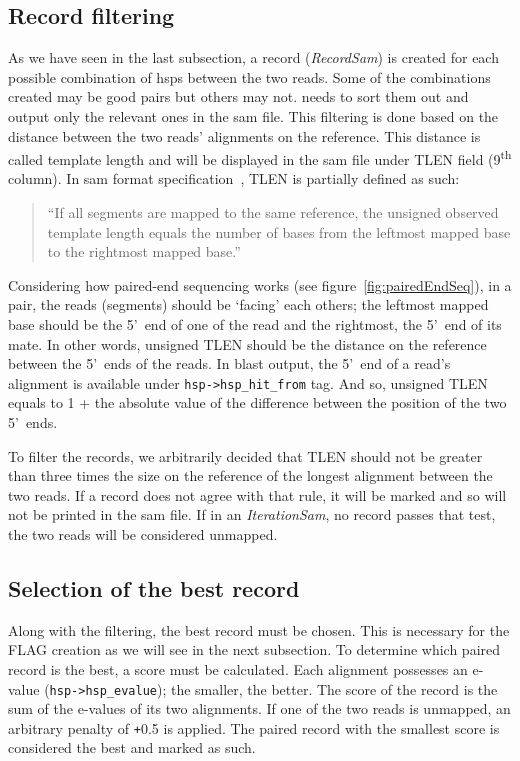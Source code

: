 \subsection{Record filtering}\label{subsec:recFilter}
As we have seen in the last subsection, a record (\emph{RecordSam}) is created for each possible combination of \glspl{hsp} between the two reads.
Some of the combinations created may be good pairs but others may not.
\blastobam{} needs to sort them out and output only the relevant ones in the \gls{sam} file.
This filtering is done based on the distance between the two reads' alignments on the reference.
This distance is called template length and will be displayed in the \gls{sam} file under TLEN field (9\textsuperscript{th} column).
In \gls{sam} format specification~\cite{samspec}, TLEN is partially defined as such:
\begin{quote}
``If all segments are mapped to the same reference, the unsigned observed template length equals the number of bases from the leftmost mapped base to the rightmost mapped base.''
\end{quote}
Considering how paired-end sequencing works (see figure~\ref{fig:pairedEndSeq}), in a pair, the reads (segments) should be `facing' each others; the leftmost mapped base should be the 5'~end of one of the read and the rightmost, the 5'~end of its mate.
In other words, unsigned TLEN should be the distance on the reference between the 5'~ends of the reads.
In \gls{blast} output, the 5'~end of a read's alignment is available under \texttt{hsp->\allowbreak{}hsp\_hit\_from} tag.
And so, unsigned TLEN equals to 1 + the absolute value of the difference between the position of the two 5'~ends.

To filter the records, we arbitrarily decided that TLEN should not be greater than three times the size on the reference of the longest alignment between the two reads.
If a record does not agree with that rule, it will be marked and so will not be printed in the \gls{sam} file.
If in an \emph{IterationSam}, no record passes that test, the two reads will be considered unmapped.


\subsection{Selection of the best record}\label{subsec:thereCanBeOnlyOne}
Along with the filtering, the best record must be chosen. This is necessary for the FLAG creation as we will see in the next subsection.
To determine which paired record is the best, a score must be calculated.
Each alignment possesses an e-value (\texttt{hsp->\allowbreak{}hsp\_evalue}); the smaller, the better.
The score of the record is the sum of the e-values of its two alignments.
If one of the two reads is unmapped, an arbitrary penalty of \texttt{+}0.5 is applied.
The paired record with the smallest score is considered the best and marked as such.


